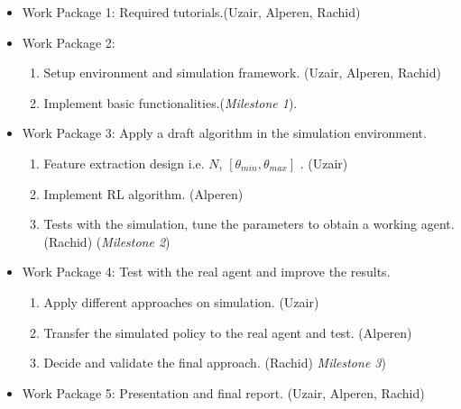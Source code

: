 \documentclass{article}
\begin{document}
\begin{itemize}
\item Work Package 1: Required tutorials.(Uzair, Alperen, Rachid)
\item Work Package 2:
\begin{enumerate}
\item Setup environment and simulation framework. (Uzair, Alperen, Rachid)
\item Implement basic functionalities.(\textit{Milestone 1}).
\end{enumerate}
\item Work Package 3: Apply a draft algorithm in the simulation environment.
\begin{enumerate}
\item Feature extraction design i.e. $N$, $[\theta_{min}, \theta_{max}]$ . (Uzair)
\item Implement RL algorithm. (Alperen)
\item Tests with the simulation, tune the parameters to obtain a working agent.(Rachid) (\textit{Milestone 2})
\end{enumerate}
\item Work Package 4: Test with the real agent and improve the results.
\begin{enumerate}
\item Apply different approaches on simulation. (Uzair)
\item Transfer the simulated policy to the real agent and test. (Alperen)
\item Decide and validate the final approach. (Rachid) \textit{Milestone 3})
\end{enumerate}
\item Work Package 5: Presentation and final report. (Uzair, Alperen, Rachid)
\end{itemize}
\end{document}
